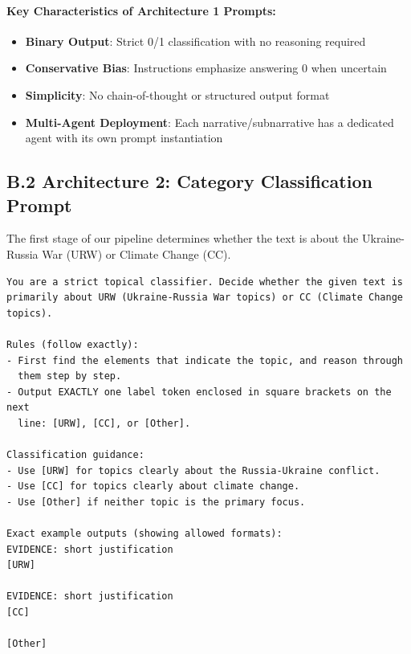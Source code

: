 \paragraph{Key Characteristics of Architecture 1 Prompts:}
\begin{itemize}
    \item \textbf{Binary Output}: Strict 0/1 classification with no reasoning required
    \item \textbf{Conservative Bias}: Instructions emphasize answering 0 when uncertain
    \item \textbf{Simplicity}: No chain-of-thought or structured output format
    \item \textbf{Multi-Agent Deployment}: Each narrative/subnarrative has a dedicated agent with its own prompt instantiation
\end{itemize}

\subsection{B.2 Architecture 2: Category Classification Prompt}
\label{app:b2-prompt-category}

The first stage of our pipeline determines whether the text is about the Ukraine-Russia War (URW) or Climate Change (CC).

\begin{tcolorbox}[breakable, colback=gray!5, colframe=gray!75!black, title=Category System Prompt]
\small
\begin{verbatim}
You are a strict topical classifier. Decide whether the given text is 
primarily about URW (Ukraine-Russia War topics) or CC (Climate Change topics).

Rules (follow exactly):
- First find the elements that indicate the topic, and reason through 
  them step by step.
- Output EXACTLY one label token enclosed in square brackets on the next 
  line: [URW], [CC], or [Other].

Classification guidance:
- Use [URW] for topics clearly about the Russia-Ukraine conflict.
- Use [CC] for topics clearly about climate change.
- Use [Other] if neither topic is the primary focus.

Exact example outputs (showing allowed formats):
EVIDENCE: short justification
[URW]

EVIDENCE: short justification
[CC]

[Other]
\end{verbatim}
\end{tcolorbox}

